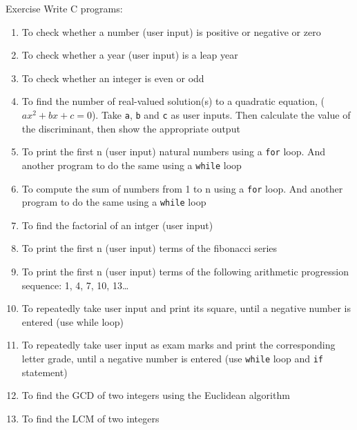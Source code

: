 \documentclass[12pt, aspectratio=169]{beamer}
\begin{document}
    \begin{frame}[allowframebreaks=0.75]{Exercise}
        Write C programs:
        \begin{enumerate}
            \item To check whether a number (user input) is positive or negative or zero
            \item To check whether a year (user input) is a leap year
            \item To check whether an integer is even or odd
            \item To find the number of real-valued solution(s) to a quadratic equation, (\(ax^2+bx+c=0\)). Take \texttt{a}, \texttt{b} and \texttt{c} as user inputs. Then calculate the value of the discriminant, then show the appropriate output
            \item To print the first n (user input) natural numbers using a \texttt{for} loop. And another program to do the same using a \texttt{while} loop
            \item To compute the sum of numbers from 1 to n using a \texttt{for} loop. And another program to do the same using a \texttt{while} loop
            \item To find the factorial of an intger (user input)
            \item To print the first n (user input) terms of the fibonacci series
            \item To print the first n (user input) terms of the following arithmetic progression sequence: 1, 4, 7, 10, 13\dots
            \item To repeatedly take user input and print its square, until a negative number is entered (use while loop)
            \item To repeatedly take user input as exam marks and print the corresponding letter grade, until a negative number is entered (use \texttt{while} loop and \texttt{if} statement)
            \item To find the GCD of two integers using the Euclidean algorithm
            \item To find the LCM of two integers
        \end{enumerate}
    \end{frame}
\end{document}
